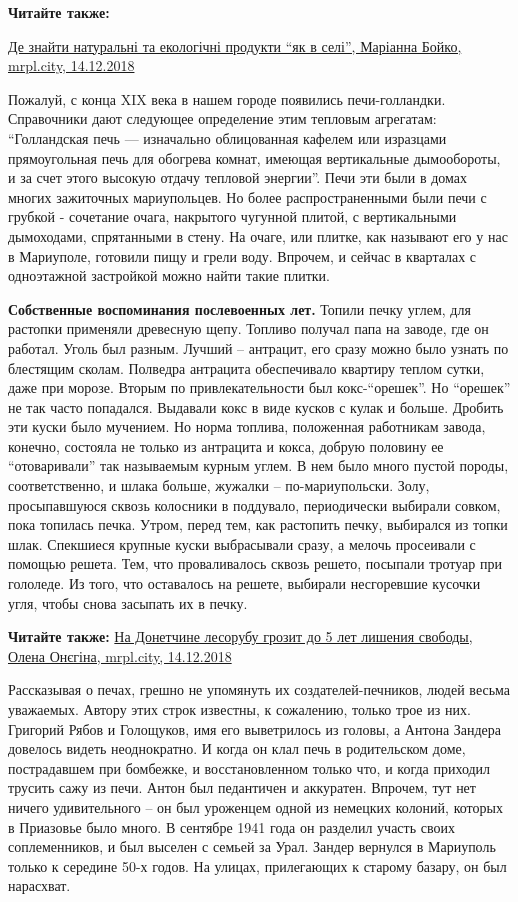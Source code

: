 \textbf{Читайте также:} 

\href{https://mrpl.city/blogs/view/de-znajti-naturalni-ta-ekologichni-produkti-yak-v-seli}{%
Де знайти натуральні та екологічні продукти \enquote{як в селі}, Маріанна Бойко, mrpl.city, 14.12.2018}

Пожалуй, с конца XΙX века в нашем городе появились печи-голландки. Справочники
дают следующее определение этим тепловым агрегатам: \enquote{Голландская печь —
изначально облицованная кафелем или изразцами прямоугольная печь для обогрева
комнат, имеющая вертикальные дымообороты, и за счет этого высокую отдачу
тепловой энергии}. Печи эти были в домах многих зажиточных мариупольцев. Но
более распространенными были печи с грубкой - сочетание очага, накрытого
чугунной плитой, с вертикальными дымоходами, спрятанными в стену. На очаге, или
плитке, как называют его у нас в Мариуполе, готовили пищу и грели воду.
Впрочем, и сейчас в кварталах с одноэтажной застройкой можно найти такие
плитки.

\textbf{Собственные воспоминания послевоенных лет.} Топили печку углем, для
растопки применяли древесную щепу. Топливо получал папа на заводе, где он
работал. Уголь был разным. Лучший – антрацит, его сразу можно было узнать по
блестящим сколам.  Полведра антрацита обеспечивало квартиру теплом сутки, даже
при морозе. Вторым по привлекательности был кокс-\enquote{орешек}. Но
\enquote{орешек} не так часто попадался.  Выдавали кокс в виде кусков с кулак и
больше. Дробить эти куски было мучением.  Но норма топлива, положенная
работникам завода, конечно, состояла не только из антрацита и кокса, добрую
половину ее \enquote{отоваривали} так называемым курным углем. В нем было много
пустой породы, соответственно, и шлака больше, жужалки – по-мариупольски. Золу,
просыпавшуюся сквозь колосники в поддувало, периодически выбирали совком, пока
топилась печка. Утром, перед тем, как растопить печку, выбирался из топки шлак.
Спекшиеся крупные куски выбрасывали сразу, а мелочь просеивали с помощью
решета. Тем, что проваливалось сквозь решето, посыпали тротуар при гололеде. Из
того, что оставалось на решете, выбирали несгоревшие кусочки угля, чтобы снова
засыпать их в печку.

\textbf{Читайте также:} \href{https://mrpl.city/news/view/na-donetchine-lesorubu-grozit-do-5-let-lisheniya-svobody}{%
На Донетчине лесорубу грозит до 5 лет лишения свободы, Олена Онєгіна, mrpl.city, 14.12.2018}

Рассказывая о печах, грешно не упомянуть их создателей-печников, людей весьма
уважаемых. Автору этих строк известны, к сожалению, только трое из них.
Григорий Рябов и Голощуков, имя его выветрилось из головы, а Антона Зандера
довелось видеть неоднократно. И когда он клал печь в родительском доме,
пострадавшем при бомбежке, и восстановленном только что, и когда приходил
трусить сажу из печи. Антон был педантичен и аккуратен. Впрочем, тут нет ничего
удивительного – он был уроженцем одной из немецких колоний, которых в Приазовье
было много. В сентябре 1941 года он разделил участь своих соплеменников, и был
выселен с семьей за Урал. Зандер вернулся в Мариуполь только к середине 50-х
годов. На улицах, прилегающих к старому базару, он был нарасхват.

